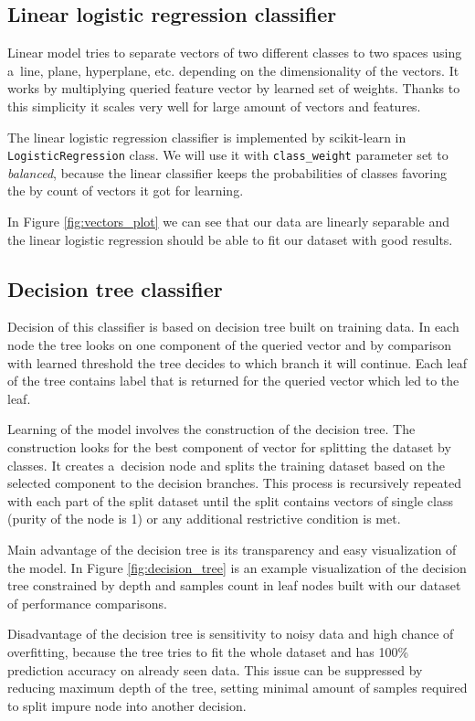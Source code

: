 \subsection{Linear logistic regression classifier}
Linear model tries to separate vectors of two different classes to two spaces
using a~line, plane, hyperplane, etc. depending on the dimensionality of the
vectors. It works by multiplying queried feature vector by learned set of
weights. Thanks to this simplicity it scales very well for large amount of
vectors and features.

The linear logistic regression classifier is implemented by scikit-learn in
\texttt{Logistic\-Regression} class. We will use it with \texttt{class\_weight}
parameter set to \emph{balanced}, because the linear classifier keeps the
probabilities of classes favoring the by count of vectors it got for learning.

In Figure \ref{fig:vectors_plot} we can see that our data are linearly separable
and the linear logistic regression should be able to fit our dataset with good results.

\subsection{Decision tree classifier}
Decision of this classifier is based on decision tree built on training data.
In each node the tree looks on one component of the queried vector and by
comparison with learned threshold the tree decides to which branch it will
continue. Each leaf of the tree contains label that is returned for the queried
vector which led to the leaf.

Learning of the model involves the construction of the decision tree. The
construction looks for the best component of vector for splitting the dataset by
classes. It creates a~decision node and splits the training dataset based on the
selected component to the decision branches. This process is recursively
repeated with each part of the split dataset until the split contains vectors of
single class (purity of the node is 1) or any additional restrictive condition
is met.

Main advantage of the decision tree is its transparency and easy visualization
of the model. In Figure \ref{fig:decision_tree} is an example visualization of
the decision tree constrained by depth and samples count in leaf nodes built with
our dataset of performance comparisons.

Disadvantage of the decision tree is sensitivity to noisy data and high
chance of overfitting, because the tree tries to fit the whole dataset and has
100\% prediction accuracy on already seen data. This issue can be suppressed by
reducing maximum depth of the tree, setting minimal amount of samples required
to split impure node into another decision.

